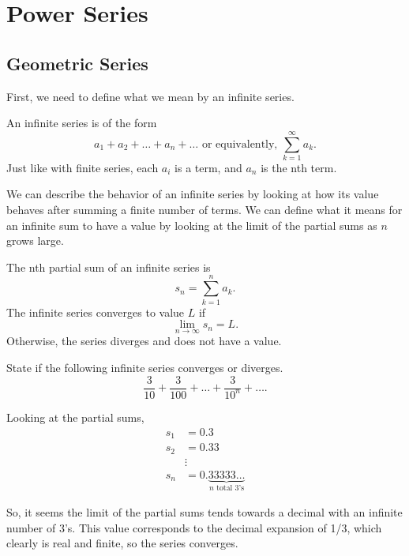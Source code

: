 \section{Power Series}
\subsection{Geometric Series}
First, we need to define what we mean by an infinite series.
\begin{definition}
	An infinite series is of the form
	\begin{equation*}
		a_1 + a_2 + \ldots + a_n + \ldots \text{ or equivalently, } \sum_{k=1}^{\infty}{a_k}.
	\end{equation*}
	Just like with finite series, each $a_i$ is a term, and $a_n$ is the nth term.
\end{definition}

We can describe the behavior of an infinite series by looking at how its value behaves after summing a finite number of terms.
We can define what it means for an infinite sum to have a value by looking at the limit of the partial sums as $n$ grows large.
\begin{definition}
	The nth partial sum of an infinite series is
	\begin{equation*}
		s_n = \sum_{k=1}^{n}{a_k}.
	\end{equation*}
	The infinite series converges to value $L$ if
	\begin{equation*}
		\lim_{n\to\infty}{s_n} = L.
	\end{equation*}
	Otherwise, the series diverges and does not have a value.
\end{definition}

\begin{example}
	State if the following infinite series converges or diverges.
	\begin{equation*}
		\frac{3}{10} + \frac{3}{100} + \ldots + \frac{3}{10^n} + \ldots.
	\end{equation*}
\end{example}
\begin{answer}
	Looking at the partial sums,
	\begin{align*}
		s_1 &= 0.3 \\
		s_2 &= 0.33 \\
		&\vdots \\
		s_n &= 0.\underbrace{33333\ldots}_{\text{$n$ total 3's}}
	\end{align*}
	
	So, it seems the limit of the partial sums tends towards a decimal with an infinite number of 3's.
	This value corresponds to the decimal expansion of 1/3, which clearly is real and finite, so the series converges.
\end{answer}


